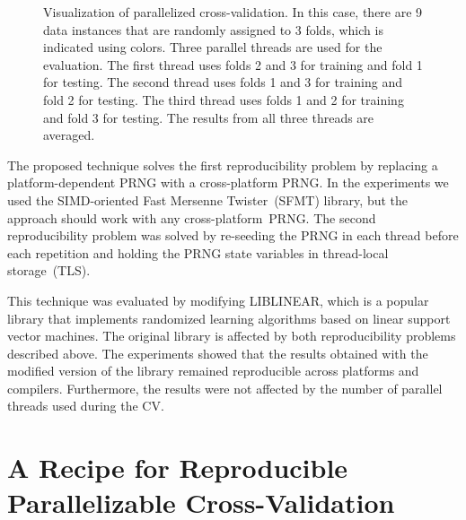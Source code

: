 \begin{figure}
  \caption{\label{fig:CV}
    Visualization of parallelized cross-validation. In this case, there are 9
    data instances that are randomly assigned to 3 folds, which is indicated
    using colors. Three parallel threads are used for the evaluation. The first
    thread uses folds 2 and 3 for training and fold 1 for testing. The second
    thread uses folds 1 and 3 for training and fold 2 for testing. The third
    thread uses folds 1 and 2 for training and fold 3 for testing. The results
    from all three threads are averaged.}
\end{figure}



\smallskip
The proposed technique solves the first reproducibility problem by replacing a
platform-dependent PRNG with a cross-platform PRNG. In the experiments we used
the SIMD-oriented Fast Mersenne Twister~(SFMT) library\supercite{saito2008simd},
but the approach should work with any cross-platform~PRNG. The second
reproducibility problem was solved by re-seeding the PRNG in each thread before
each repetition and holding the PRNG state variables in thread-local
storage~(TLS).

\smallskip
This technique was evaluated by modifying LIBLINEAR\supercite{fan2008liblinear},
which is a popular library that implements randomized learning algorithms based on
linear support vector machines\supercite{vapnik1998statistical}. The original
library is affected by both reproducibility problems described above.
The experiments showed that the results obtained with the modified version
of the library remained reproducible across platforms and compilers.
Furthermore, the results were not affected by the number of parallel threads
used during the CV.


\section{A Recipe for Reproducible Parallelizable Cross-\!Validation}


